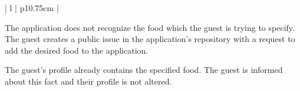 \begin{center}
\begin{tabular}{| l | p{10.75cm} | }
\begin{minipage}[t]{\linewidth}
\begin{description}[nosep,after=\strut]
        \item [A3:] The application does not recognize the food which the guest is trying to specify. The guest creates a public issue in the application's repository with a request to add the desired food to the application.
        \item [A4:] The guest's profile already contains the specified food. The guest is informed about this fact and their profile is not altered.
      \end{description}
    \end{minipage}
    \\
    \hline
  \end{tabular}
  \newline
\end{center}

\newpage

